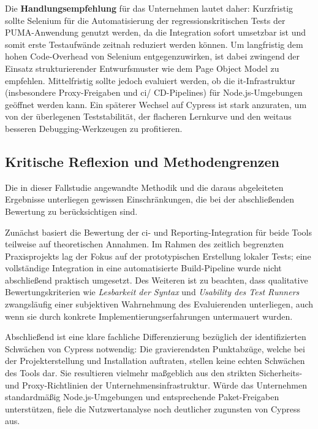 Die \textbf{Handlungsempfehlung} für das Unternehmen lautet daher: Kurzfristig sollte Selenium für die Automatisierung der regressionskritischen Tests der PUMA-Anwendung genutzt werden, da die Integration sofort umsetzbar ist und somit erste Testaufwände zeitnah reduziert werden können. Um langfristig dem hohen Code-Overhead von Selenium entgegenzuwirken, ist dabei zwingend der Einsatz strukturierender Entwurfsmuster wie dem Page Object Model zu empfehlen. Mittelfristig sollte jedoch evaluiert werden, ob die \gls{it}-Infrastruktur (insbesondere Proxy-Freigaben und \gls{ci}/ CD-Pipelines) für Node.js-Umgebungen geöffnet werden kann. Ein späterer Wechsel auf Cypress ist stark anzuraten, um von der überlegenen Teststabilität, der flacheren Lernkurve und den weitaus besseren Debugging-Werkzeugen zu profitieren.




\subsection{Kritische Reflexion und Methodengrenzen}
\label{sec:reflexion}

Die in dieser Fallstudie angewandte Methodik und die daraus abgeleiteten Ergebnisse unterliegen gewissen Einschränkungen, die bei der abschließenden Bewertung zu berücksichtigen sind. 

Zunächst basiert die Bewertung der \gls{ci}- und Reporting-Integration für beide Tools teilweise auf theoretischen Annahmen. Im Rahmen des zeitlich begrenzten Praxisprojekts lag der Fokus auf der prototypischen Erstellung lokaler Tests; eine vollständige Integration in eine automatisierte Build-Pipeline wurde nicht abschließend praktisch umgesetzt. Des Weiteren ist zu beachten, dass qualitative Bewertungskriterien wie \textit{Lesbarkeit der Syntax} und \textit{Usability des Test Runners} zwangsläufig einer subjektiven Wahrnehmung des Evaluierenden unterliegen, auch wenn sie durch konkrete Implementierungserfahrungen untermauert wurden.

Abschließend ist eine klare fachliche Differenzierung bezüglich der identifizierten Schwächen von Cypress notwendig: Die gravierendsten Punktabzüge, welche bei der Projekterstellung und Installation auftraten, stellen keine echten Schwächen des Tools dar. Sie resultieren vielmehr maßgeblich aus den strikten Sicherheits- und Proxy-Richtlinien der Unternehmensinfrastruktur. Würde das Unternehmen standardmäßig Node.js-Umgebungen und entsprechende Paket-Freigaben unterstützen, fiele die Nutzwertanalyse noch deutlicher zugunsten von Cypress aus.

